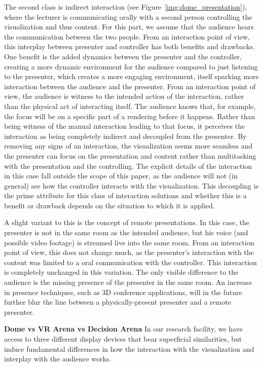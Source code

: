 \documentclass[review,journal]{vgtc}         %
\begin{document}
The second class is indirect interaction (see Figure~\ref{img:dome_presentation}), where the lecturer is communicating orally with a second person controlling the visualization and thus content.
For this part, we assume that the audience hears the communication between the two people.
From an interaction point of view, this interplay between presenter and controller has both benefits and drawbacks.
One benefit is the added dynamics between the presenter and the controller, creating a more dynamic environment for the audience compared to just listening to the presenter, which creates a more engaging environment, itself sparking more interaction between the audience and the presenter.
From an interaction point of view, the audience is witness to the intended action of the interaction, rather than the physical act of interacting itself.
The audience knows that, for example, the focus will be on a specific part of a rendering before it happens.
Rather than being witness of the manual interaction leading to that focus, it perceives the interaction as being completely indirect and decoupled from the presenter.
By removing any signs of an interaction, the visualization seems more seamless and the presenter can focus on the presentation and content rather than multitasking with the presentation and the controlling.
The explicit details of the interaction in this case fall outside the scope of this paper, as the audience will not (in general) see how the controller interacts with the visualization.
This decoupling is the prime attribute for this class of interaction solutions and whether this is a benefit or drawback depends on the situation to which it is applied.

A slight variant to this is the concept of remote presentations.
In this case, the presenter is not in the same room as the intended audience, but his voice (and possible video footage) is streamed live into the same room.
From an interaction point of view, this does not change much, as the presenter's interaction with the content was limited to a oral communication with the controller.
This interaction is completely unchanged in this variation.
The only visible difference to the audience is the missing presence of the presenter in the same room.
An increase in presence techniques, such as 3D conference applications, will in the future further blur the line between a physically-present presenter and a remote presenter.


\noindent \textbf{Dome vs VR Arena vs Decision Arena} In our research facility, we have access to three different display devices that bear superficial similarities, but induce fundamental differences in how the interaction with the visualization and interplay with the audience works.
\end{document}
